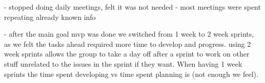 - stopped doing daily meetings, felt it was not needed - most meetings were spent repeating already known info 

- after the main goal mvp was done we switched from 1 week to 2 week sprints, as we felt the tasks ahead required more time to develop and progress. using 2 week sprints allows the group to take a day off after a sprint to work on other stuff unrelated to the issues in the sprint if they want. When having 1 week sprints the time spent developing vs time spent planning is (not enough we feel). 

